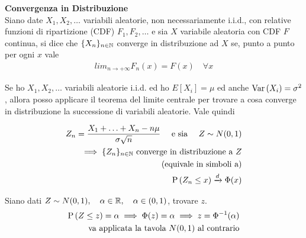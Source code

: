 \begin{defn}
    \textbf{Convergenza in Distribuzione} \\
    Siano date $X_1, X_2, \hdots$ variabili aleatorie, non necessariamente i.i.d., con relative funzioni
    di ripartizione (CDF) $F_1, F_2, \hdots$ e sia $X$ variabile aleatoria
    con CDF $F$ continua, si dice che $\{X_n\}_{n \in \mathbb{N}}$ converge in
    distribuzione ad $X$ se, punto a punto per ogni $x$ vale
    \begin{equation*}
        \begin{aligned}
            lim_{n \to +\infty} F_n(x) = F(x) \quad \forall x
        \end{aligned}
    \end{equation*}

    \begin{note}
        Se ho $X_1, X_2, \hdots$ variabili aleatorie i.i.d. ed ho $E[X_i] = \mu$
        ed anche $\text{Var}\left(X_i\right) = \sigma^2$, allora posso applicare il teorema del
        limite centrale per trovare a cosa converge in distribuzione la
        successione di variabili aleatorie. Vale quindi

        \begin{equation*}
            \begin{aligned}
                Z_n = \frac{X_1 + \hdots + X_n - n\mu}{\sigma \sqrt{n}} \quad \text{ e sia } \quad Z \sim N (0, 1) \\
                \implies \{Z_n\}_{n \in \mathbb{N}} \text{ converge in distribuzione a } Z \\ \text{(equivale in simboli a)} \\
                \text{P}\left(Z_n \leq x\right) \xrightarrow{d} \Phi(x)
            \end{aligned}
        \end{equation*}
    \end{note}

\end{defn}

\begin{exmp}
    Siano dati $Z \sim N(0,1), \quad \alpha \in \mathbb{R}, \quad \alpha \in (0, 1)$,
    trovare $z$.
    \begin{equation*}
        \begin{aligned}
            \text{P}\left(Z \leq z\right) = \alpha \implies \Phi(z) = \alpha \implies z = \Phi^{-1}(\alpha) \\
            \text{va applicata la tavola } N(0,1) \text{ al contrario}
        \end{aligned}
    \end{equation*}
\end{exmp}

